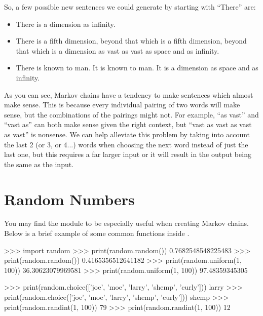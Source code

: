 \documentclass[11pt]{cselabheader}
\begin{document}
So, a few possible new sentences we could generate by starting with ``There'' are:
\begin{itemize}
  \item There is a dimension as infinity.
  \item There is a fifth dimension, beyond that which is a fifth dimension,
    beyond that which is a dimension as vast as vast as space and as infinity.
  \item There is known to man. It is known to man. It is a dimension as space
    and as infinity.
\end{itemize}

As you can see, Markov chains have a tendency to make sentences which almost
make sense. This is because every individual pairing of two words will make
sense, but the combinations of the pairings might not. For example, ``as vast''
and ``vast as'' can both make sense given the right context, but ``vast as vast
as vast as vast'' is nonsense. We can help alleviate this problem by taking into
account the last 2 (or 3, or 4...) words when choosing the next word instead of
just the last one, but this requires a far larger input or it will result in the
output being the same as the input.

\section{Random Numbers}
\label{sec:random}
You may find the module  to be especially useful when
creating Markov chains. Below is a brief example of some common functions
inside .

\begin{pyconcode}
>>> import random
>>> print(random.random())
0.7682548548225483
>>> print(random.random())
0.4165356512641182
>>> print(random.uniform(1, 100))
36.30623079969581
>>> print(random.uniform(1, 100))
97.48359345305
\end{pyconcode}
\begin{pyconcode}
>>> print(random.choice(['joe', 'moe', 'larry', 'shemp', 'curly']))
larry
>>> print(random.choice(['joe', 'moe', 'larry', 'shemp', 'curly']))
shemp
>>> print(random.randint(1, 100))
79
>>> print(random.randint(1, 100))
12
\end{pyconcode}
\end{document}
